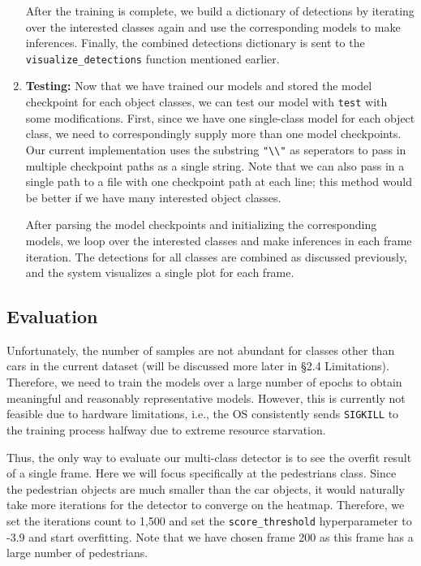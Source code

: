 \documentclass[letter]{article}
\begin{document}
\begin{enumerate}
		After the training is complete, we build a dictionary of detections by iterating over the interested classes again and use the corresponding models to make inferences. Finally, the combined detections dictionary is sent to the \verb|visualize_detections| function mentioned earlier.

		\item \textbf{Testing:} Now that we have trained our models and stored the model checkpoint for each object classes, we can test our model with \verb|test| with some modifications. First, since we have one single-class model for each object class, we need to correspondingly supply more than one model checkpoints. Our current implementation uses the substring \verb|"\\"| as seperators to pass in multiple checkpoint paths as a single string. Note that we can also pass in a single path to a file with one checkpoint path at each line; this method would be better if we have many interested object classes. 
		
		After parsing the model checkpoints and initializing the corresponding models, we loop over the interested classes and make inferences in each frame iteration. The detections for all classes are combined as discussed previously, and the system visualizes a single plot for each frame. 

	\end{enumerate}

	\subsection{Evaluation}

	Unfortunately, the number of samples are not abundant for classes other than cars in the current dataset (will be discussed more later in \S 2.4 Limitations). Therefore, we need to train the models over a large number of epochs to obtain meaningful and reasonably representative models. However, this is currently not feasible due to hardware limitations, i.e., the OS consistently sends \verb|SIGKILL| to the training process halfway due to extreme resource starvation. 

	Thus, the only way to evaluate our multi-class detector is to see the overfit result of a single frame. Here we will focus specifically at the pedestrians class. Since the pedestrian objects are much smaller than the car objects, it would naturally take more iterations for the detector to converge on the heatmap. Therefore, we set the iterations count to 1,500 and set the \verb|score_threshold| hyperparameter to -3.9 and start overfitting. Note that we have chosen frame 200 as this frame has a large number of pedestrians. 
	
\end{document}
